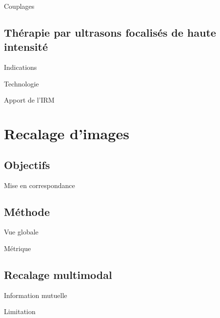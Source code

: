 \documentclass{beamer}
\begin{document}
\begin{frame}{Couplages}
 
\end{frame}

\subsection{Thérapie par ultrasons focalisés de haute intensité}
\begin{frame}{Indications}
 
\end{frame}

\begin{frame}{Technologie}
 
\end{frame}

\begin{frame}{Apport de l'IRM}
 
\end{frame}


\section{Recalage d'images}
\subsection{Objectifs}
\begin{frame}{Mise en correspondance}
 
\end{frame}

\subsection{Méthode}
\begin{frame}{Vue globale}
 
\end{frame}
\begin{frame}{Métrique}
 
\end{frame}

\subsection{Recalage multimodal}
\begin{frame}{Information mutuelle}
 
\end{frame}
\begin{frame}{Limitation}
 
\end{frame}
\end{document}

